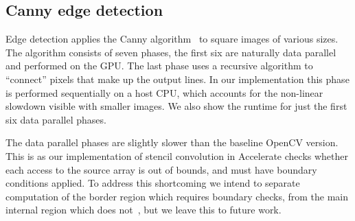  


\subsection{Canny edge detection}
Edge detection applies the Canny algorithm~\cite{Canny:1986et} to square images of various sizes. The algorithm consists of seven phases, the first six are naturally data parallel and performed on the GPU. The last phase uses a recursive algorithm to ``connect'' pixels that make up the output lines. In our implementation this phase is performed sequentially on a host CPU, which accounts for the non-linear slowdown visible with smaller images. We also show the runtime for just the first six data parallel phases.


The data parallel phases are slightly slower than the baseline OpenCV version. This is as our implementation of stencil convolution in Accelerate checks whether each access to the source array is out of bounds, and must have boundary conditions applied. To address this shortcoming we intend to separate computation of the border region which requires boundary checks, from the main internal region which does not~\cite{Lippmeier:Stencil}, but we leave this to future work.


